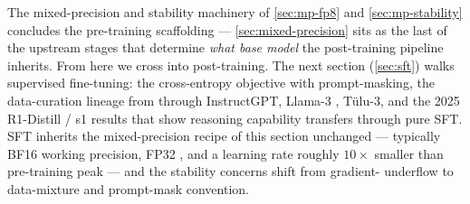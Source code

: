The mixed-precision and stability machinery of \cref{sec:mp-fp8} and
\cref{sec:mp-stability} concludes the pre-training scaffolding —
\cref{sec:mixed-precision} sits as the last of the upstream stages
that determine \emph{what base model} the post-training pipeline
inherits. From here we cross into post-training. The next section
(\cref{sec:sft}) walks supervised fine-tuning: the cross-entropy
objective with prompt-masking, the data-curation lineage from 
through InstructGPT, Llama-3 , T\"ulu-3, and
the 2025 R1-Distill / s1 results that show reasoning capability
transfers through pure SFT. SFT inherits the mixed-precision recipe
of this section unchanged — typically BF16 working precision, FP32
, and a learning rate roughly $10\times$ smaller than
pre-training peak — and the stability concerns shift from gradient-
underflow to data-mixture and prompt-mask convention.
